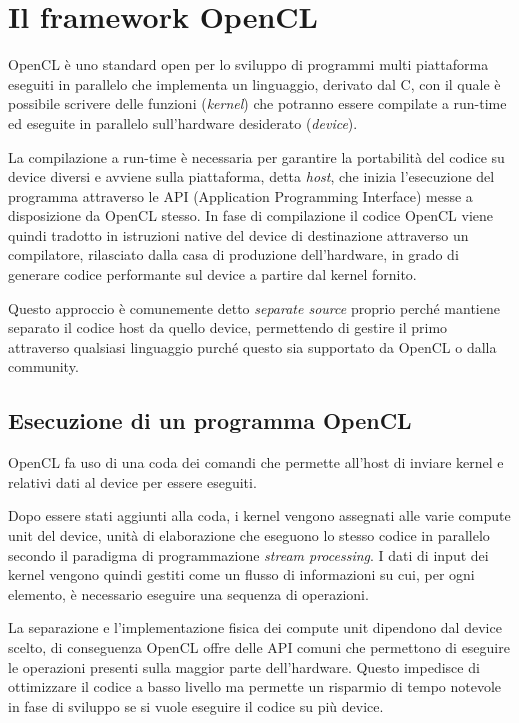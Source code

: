 \chapter{Il framework OpenCL}\label{capitolo2opencl}
\vspace{4cm}
OpenCL\cite{opencl} è uno standard open per lo sviluppo di programmi multi piattaforma eseguiti in parallelo che implementa un linguaggio, derivato dal C, con il quale è possibile scrivere delle funzioni (\textit{kernel}) che potranno essere compilate a run-time ed eseguite in parallelo sull'hardware desiderato (\textit{device}).

La compilazione a run-time è necessaria per garantire la portabilità del codice su device diversi e avviene sulla piattaforma, detta \textit{host}, che inizia l'esecuzione del programma attraverso le API (Application Programming Interface) messe a disposizione da OpenCL stesso.
In fase di compilazione il codice OpenCL viene quindi tradotto in istruzioni native del device di destinazione attraverso un compilatore, rilasciato dalla casa di produzione dell'hardware, in grado di generare codice performante sul device a partire dal kernel fornito.

Questo approccio è comunemente detto \textit{separate source} proprio perché mantiene separato il codice host da quello device, permettendo di gestire il primo attraverso qualsiasi linguaggio purché questo sia supportato da OpenCL o dalla community.

\section{Esecuzione di un programma OpenCL}
OpenCL fa uso di una coda dei comandi che permette all'host di inviare kernel e relativi dati al device per essere eseguiti.

Dopo essere stati aggiunti alla coda, i kernel vengono assegnati alle varie compute unit del device, unità di elaborazione che eseguono lo stesso codice in parallelo secondo il paradigma di programmazione \textit{stream processing}. I dati di input dei kernel vengono quindi gestiti come un flusso di informazioni su cui, per ogni elemento, è necessario eseguire una sequenza di operazioni.
 
La separazione e l'implementazione fisica dei compute unit dipendono dal device scelto, di conseguenza OpenCL offre delle API comuni che permettono di eseguire le operazioni presenti sulla maggior parte dell'hardware. Questo impedisce di ottimizzare il codice a basso livello ma permette un risparmio di tempo notevole in fase di sviluppo se si vuole eseguire il codice su più device.

